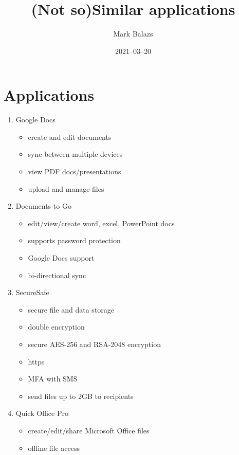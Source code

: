 \documentclass[12pt]{article}
\title{(Not so)Similar applications}
\author{Mark Balazs}
\date{2021–03–20}
\begin{document}
\maketitle
    \section{Applications}
        \begin{enumerate}
        \item Google Docs
            \begin{itemize}
                \item create and edit documents
                \item sync between multiple devices
                \item view PDF docs/presentations
                \item upload and manage files
            \end{itemize}
        \item Documents to Go
            \begin{itemize}
                \item edit/view/create word, excel, PowerPoint docs
                \item supports password protection
                \item Google Docs support
                \item bi-directional sync
            \end{itemize}
        \item SecureSafe
            \begin{itemize}
                \item secure file and data storage
                \item double encryption
                \item secure AES-256 and RSA-2048 encryption
                \item https
                \item MFA with SMS
                \item send files up to 2GB to recipients
            \end{itemize}
        \item Quick Office Pro
            \begin{itemize}
                \item create/edit/share Microsoft Office files
                \item offline file access
            \end{itemize}
        \end{enumerate}
\end{document}
